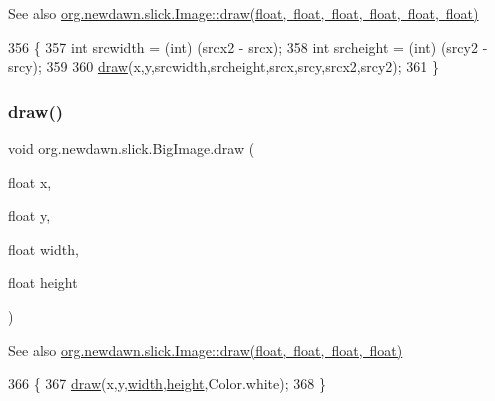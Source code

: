 \begin{DoxySeeAlso}{See also}
\mbox{\hyperlink{classorg_1_1newdawn_1_1slick_1_1_image_a393c77eb139672d549dd0c96360b9d45}{org.\+newdawn.\+slick.\+Image\+::draw(float, float, float, float, float, float)}} 
\end{DoxySeeAlso}

\begin{DoxyCode}
356                                                                                          \{
357         \textcolor{keywordtype}{int} srcwidth = (int) (srcx2 - srcx);
358         \textcolor{keywordtype}{int} srcheight = (int) (srcy2 - srcy);
359 
360         \mbox{\hyperlink{classorg_1_1newdawn_1_1slick_1_1_big_image_a75b5b008adf93b038aa56e9cfefd1a1c}{draw}}(x,y,srcwidth,srcheight,srcx,srcy,srcx2,srcy2);
361     \}
\end{DoxyCode}
\mbox{\label{classorg_1_1newdawn_1_1slick_1_1_big_image_a08d439d7c21b87544e0e72de28773fbc}} 
\subsubsection{\texorpdfstring{draw()}{draw()}\hspace{0.1cm}{\footnotesize\ttfamily [7/10]}}
{\footnotesize\ttfamily void org.\+newdawn.\+slick.\+Big\+Image.\+draw (\begin{DoxyParamCaption}\item[{float}]{x,  }\item[{float}]{y,  }\item[{float}]{width,  }\item[{float}]{height }\end{DoxyParamCaption})\hspace{0.3cm}{\ttfamily [inline]}}

\begin{DoxySeeAlso}{See also}
\mbox{\hyperlink{classorg_1_1newdawn_1_1slick_1_1_image_a637e8d14b7705e8c6ca0b95c2aa92b93}{org.\+newdawn.\+slick.\+Image\+::draw(float, float, float, float)}} 
\end{DoxySeeAlso}

\begin{DoxyCode}
366                                                                   \{
367         \mbox{\hyperlink{classorg_1_1newdawn_1_1slick_1_1_big_image_a75b5b008adf93b038aa56e9cfefd1a1c}{draw}}(x,y,\mbox{\hyperlink{classorg_1_1newdawn_1_1slick_1_1_image_a7d02c85e21b388428cfe5cc5c82714a1}{width}},\mbox{\hyperlink{classorg_1_1newdawn_1_1slick_1_1_image_a54397a37823bc59ddc79ec70dc5cf226}{height}},Color.white);
368     \}
\end{DoxyCode}
\mbox{\label{classorg_1_1newdawn_1_1slick_1_1_big_image_ab5a981b5afffa76f8fe40e3960f921db}} 
